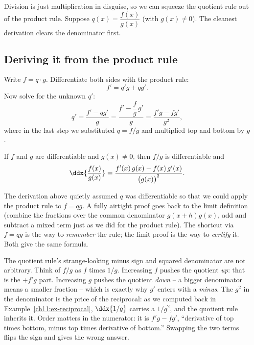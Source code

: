 Division is just multiplication in disguise, so we can squeeze the quotient rule out of
the product rule. Suppose $q(x) = \dfrac{f(x)}{g(x)}$ (with $g(x)\ne 0$). The cleanest
derivation clears the denominator first.

\subsection{Deriving it from the product rule}

Write $f = q\cdot g$. Differentiate both sides with the product rule:
\[
  f' = q' g + q g'.
\]
Now solve for the unknown $q'$:
\[
  q' = \frac{f' - q g'}{g} = \frac{f' - \dfrac{f}{g}\,g'}{g}
     = \frac{f' g - f g'}{g^2},
\]
where in the last step we substituted $q=f/g$ and multiplied top and bottom by $g$.

\begin{theorem}\label{ch11:thm-quotient}
If $f$ and $g$ are differentiable and $g(x)\ne 0$, then $f/g$ is differentiable and
\[
  \ddx{\frac{f(x)}{g(x)}}
  = \frac{f'(x)\,g(x) - f(x)\,g'(x)}{\big(g(x)\big)^2}.
\]
\end{theorem}

\begin{remark}
The derivation above quietly assumed $q$ was differentiable so that we could apply the
product rule to $f=qg$. A fully airtight proof goes back to the limit definition (combine
the fractions over the common denominator $g(x+h)g(x)$, add and subtract a mixed term just
as we did for the product rule). The shortcut via $f=qg$ is the way to \emph{remember}
the rule; the limit proof is the way to \emph{certify} it. Both give the same formula.
\end{remark}

\begin{whybox}
The quotient rule's strange-looking minus sign and squared denominator are not arbitrary.
Think of $f/g$ as $f$ times $1/g$. Increasing $f$ pushes the quotient \emph{up}: that is
the $+f' g$ part. Increasing $g$ pushes the quotient \emph{down} -- a bigger denominator
means a smaller fraction -- which is exactly why $g'$ enters with a \emph{minus}. The
$g^2$ in the denominator is the price of the reciprocal: as we computed back in
Example~\ref{ch11:ex-reciprocal}, $\ddx{1/g}$ carries a $1/g^2$, and the quotient rule
inherits it. Order matters in the numerator: it is $f'g - fg'$, ``derivative of top times
bottom, minus top times derivative of bottom.'' Swapping the two terms flips the sign and
gives the wrong answer.
\end{whybox}

